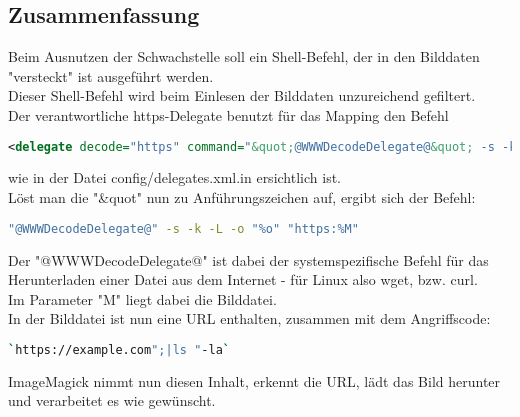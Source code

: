 \subsection{Zusammenfassung}\label{subsec:zusammenfassung}

Beim Ausnutzen der Schwachstelle soll ein Shell-Befehl, der in den Bilddaten "versteckt" ist ausgeführt werden.\\
Dieser Shell-Befehl wird beim Einlesen der Bilddaten unzureichend gefiltert.\\

Der verantwortliche https-Delegate benutzt für das Mapping den Befehl\\

\begin{lstlisting}[firstnumber=91, language=XML, caption=config/delegates.xml.in https-Delegate,label={lst:lstlisting}]
  <delegate decode="https" command="&quot;@WWWDecodeDelegate@&quot; -s -k -L -o &quot;%o&quot; &quot;https:%M&quot;"/>
\end{lstlisting}
\vspace{5mm}

wie in der Datei config/delegates.xml.in ersichtlich ist.\\

Löst man die "&quot" nun zu Anführungszeichen auf, ergibt sich der Befehl:\\
\begin{lstlisting}[firstnumber=1, language=Bash, caption=Aufgelöster https-Delegate-Befehl,label={lst:lstlisting}]
"@WWWDecodeDelegate@" -s -k -L -o "%o" "https:%M"
\end{lstlisting}
\vspace{5mm}

Der "@WWWDecodeDelegate@" ist dabei der systemspezifische Befehl für das Herunterladen einer Datei aus dem Internet - für Linux also wget, bzw. curl.\\
Im Parameter "M" liegt dabei die Bilddatei.\\

In der Bilddatei ist nun eine URL enthalten, zusammen mit dem Angriffscode:\\

\begin{lstlisting}[firstnumber=91, language=Bash, caption=Beispielhafter Inhalt einer Angriffsdatei,label={lst:lstlisting}]
`https://example.com";|ls "-la`
\end{lstlisting}
\vspace{5mm}

ImageMagick nimmt nun diesen Inhalt, erkennt die URL, lädt das Bild herunter und verarbeitet es wie gewünscht.\\

